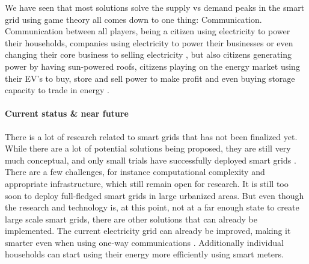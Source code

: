 We have seen that most solutions solve the supply vs demand peaks in the smart grid using game theory all comes down to one thing: Communication. Communication between all players, being a citizen using electricity to power their households, companies using electricity to power their businesses or even changing their core business to selling electricity \cite{Binczewski2002,Kumagai2012}, but also citizens generating power by having sun-powered roofs, citizens playing on the energy market using their EV's to buy, store and sell power to make profit and even buying storage capacity to trade in energy .

\paragraph{Current status \& near future}

There is a lot of research related to smart grids that has not been finalized yet. While there are a lot of potential solutions being proposed, they are still very much conceptual, and only small trials have successfully deployed smart grids \cite{Kumagai2012,HatziargyriouAsanoIravaniMarnay2007}. There are a few challenges, for instance computational complexity and appropriate infrastructure, which still remain open for research. It is still too soon to deploy full-fledged smart grids in large urbanized areas.
But even though the research and technology is, at this point, not at a far enough state to create large scale smart grids, there are other solutions that can already be implemented. The current electricity grid can already be improved, making it smarter even when using one-way communications \cite{Alamaniotis2010}. Additionally individual households can start using their energy more efficiently using smart meters. 